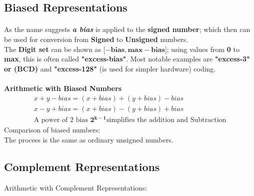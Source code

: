 \subsection{Biased Representations}
\paragraph{}
As the name suggests\textit{\textbf{ a bias}} is applied to the \textbf{signed number}; which then can be used for conversion from\textbf{ Signed} to \textbf{Unsigned} numbers.\\
The\textbf{ Digit set }can be shown as \( \mathbf{{[-bias,max-bias}]} \); using values from \textbf{0} to \textbf{max}, this is often called \textbf{"excess-bias"}. Most notable examples are \textbf{"excess-3" or (BCD)} and \textbf{"excess-128"} (is used for simpler hardware) coding.
\paragraph{}
\textbf{Arithmetic with Biased Numbers}
\begin{align*}
	x+y-bias=(x+bias)+(y+bias)-bias \\
	x-y+bias=(x+bias)-(y+bias)+bias\\
	\text{A power of 2 bias }\mathbf{2^{k-1}}\text{simplifies the addition and Subtraction}
\end{align*}
Comparison of biased numbers:\\
The process is the same as  ordinary unsigned numbers.

\subsection{Complement Representations}
Arithmetic with Complement Representations:\\\\
\begin{table}[h]
	\centering
\end{table}
